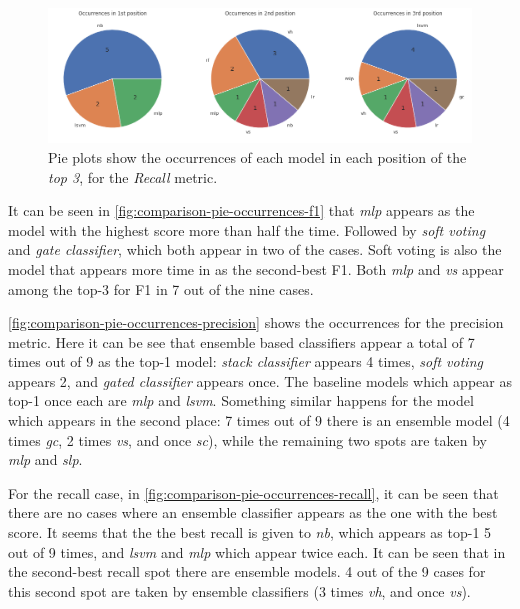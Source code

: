 \documentclass[epsfig,a4paper,11pt,titlepage,twoside,openany]{book}
\begin{document}
\begin{figure}[H]
  \centering \includegraphics[width=\textwidth]{comparison_recall_top_spaces_pies} 
  \caption{Pie plots show the occurrences of each model in each position of the \textit{top 3}, for the \textit{Recall} metric.}
  \label{fig:comparison-pie-occurrences-recall}
\end{figure}

It can be seen in \autoref{fig:comparison-pie-occurrences-f1} that \textit{mlp} appears as the model with the highest score more than half the time. Followed by \textit{soft voting} and \textit{gate classifier}, which both appear in two of the cases. Soft voting is also the model that appears more time in as the second-best F1. Both \textit{mlp} and \textit{vs} appear among the top-3 for F1 in 7 out of the nine cases.


\autoref{fig:comparison-pie-occurrences-precision} shows the occurrences for the precision metric. Here it can be see that ensemble based classifiers appear a total of 7 times out of 9 as the top-1 model: \textit{stack classifier} appears 4 times, \textit{soft voting} appears 2, and \textit{gated classifier} appears once. The baseline models which appear as top-1 once each are \textit{mlp} and \textit{lsvm}. Something similar happens for the model which appears in the second place: 7 times out of 9 there is an ensemble model (4 times \textit{gc}, 2 times \textit{vs}, and once \textit{sc}), while the remaining two spots are taken by \textit{mlp} and \textit{slp}. 

For the recall case, in \autoref{fig:comparison-pie-occurrences-recall}, it can be seen that there are no cases where an ensemble classifier appears as the one with the best score. It seems that the the best recall is given to \textit{nb}, which appears as top-1 5 out of 9 times, and \textit{lsvm} and \textit{mlp} which appear twice each. It can be seen that in the second-best recall spot there are ensemble models. 4 out of the 9 cases for this second spot are taken by ensemble classifiers (3 times \textit{vh}, and once \textit{vs}). 
\end{document}
